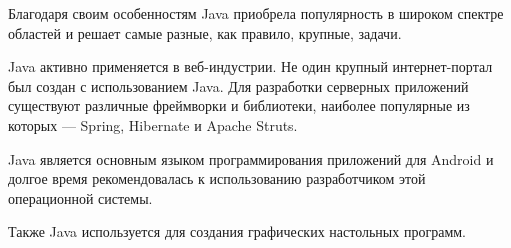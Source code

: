 Благодаря своим особенностям Java приобрела популярность в широком спектре областей и решает самые разные, как правило, крупные, задачи.

Java активно применяется в веб-индустрии. Не один крупный интернет-портал был создан с использованием Java. Для разработки серверных приложений существуют различные фреймворки и библиотеки, наиболее популярные из которых --- Spring, Hibernate и Apache Struts.

Java является основным языком программирования приложений для Android и долгое время рекомендовалась к использованию разработчиком этой операционной системы.

Также Java используется для создания графических настольных программ.
